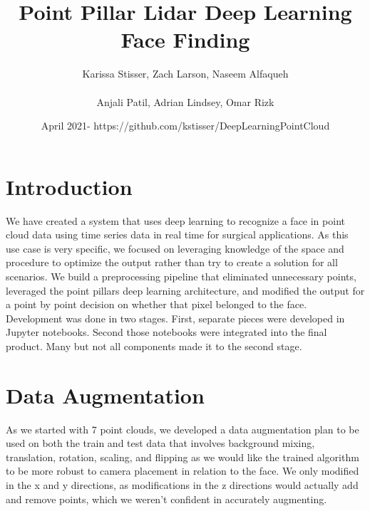 \documentclass{article}
\title{Point Pillar Lidar Deep Learning Face Finding}
\author{Karissa Stisser, Zach Larson, Naseem Alfaqueh\\
\\Anjali Patil, Adrian Lindsey, Omar Rizk }
\date{April 2021- https://github.com/kstisser/DeepLearningPointCloud}
\begin{document}
\maketitle

\section{Introduction}
We have created a system that uses deep learning to recognize a face in point cloud data using time series data in real time for surgical applications. As this use case is very specific, we focused on leveraging knowledge of the space and procedure to optimize the output rather than try to create a solution for all scenarios. We build a preprocessing pipeline that eliminated unnecessary points, leveraged the point pillars deep learning architecture\cite{pointpillars}, and modified the output for a point by point decision on whether that pixel belonged to the face. Development was done in two stages. First, separate pieces were developed in Jupyter notebooks. Second those notebooks were integrated into the final product. Many but not all components made it to the second stage. 
\section{Data Augmentation}
As we started with 7 point clouds, we developed a data augmentation plan to be used on both the train and test data that involves background mixing, translation, rotation, scaling, and flipping as we would like the trained algorithm to be more robust to camera placement in relation to the face. We only modified in the x and y directions, as modifications in the z directions would actually add and remove points, which we weren't confident in accurately augmenting. 
\end{document}
